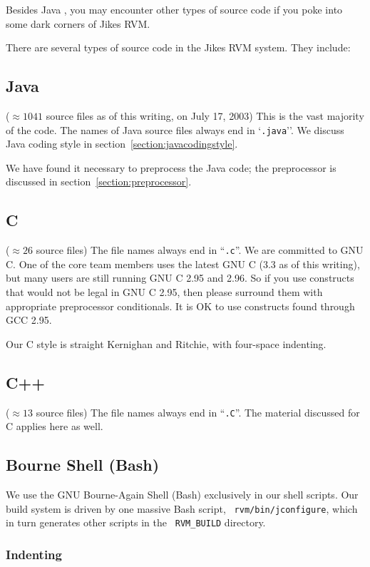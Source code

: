 Besides Java , you may
encounter other types of source code if you poke into some dark
corners of Jikes RVM.  

There are several types of source code in the Jikes RVM system.  They
include:


\subsection{Java} 
($\approx 1041$ source files as of this writing, on July 17, 2003)  This is
the vast majority of the code.  The names of Java source files always end in
`{\tt .java}''.   We discuss Java coding style in
section~\ref{section:javacodingstyle}. 

We have found it necessary to preprocess the Java code; the
preprocessor is discussed in section~\ref{section:preprocessor}.


\subsection {C}

($\approx 26$ source files)  The file names always
end in ``{\tt .c}''.  We are committed to GNU C.  One of the core team
members uses the latest GNU C (3.3 as of this writing), but many users
are still running GNU C 2.95 and 2.96.  So if you use constructs that
would not be legal in GNU C 2.95, then please surround them with
appropriate preprocessor conditionals.  It is OK to use constructs
found through GCC 2.95.

Our C style is straight Kernighan and Ritchie, with four-space
indenting.  

\subsection{C++} 

($\approx 13$ source files)  The file names always end in
``{\tt .C}''.   The material discussed for C applies here as well.

\subsection{Bourne Shell (Bash)}

We use the GNU Bourne-Again Shell (Bash) exclusively in our shell
scripts.  Our build system is driven by one massive Bash script, {\tt
rvm/bin/jconfigure}, which in turn generates other scripts in the {\tt
RVM\_BUILD} directory.

\subsubsection{Indenting}

